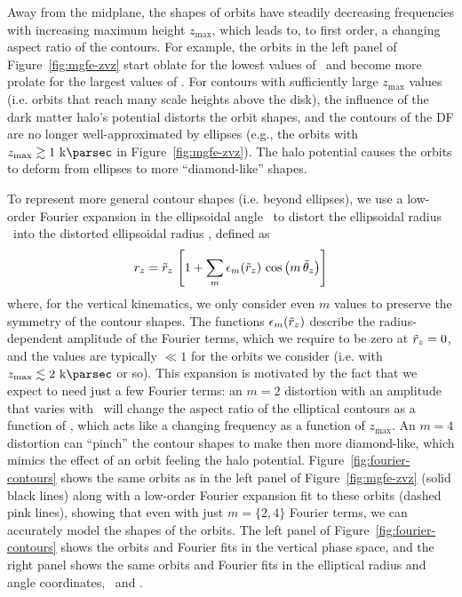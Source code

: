 Away from the midplane, the shapes of orbits have steadily decreasing frequencies with
increasing maximum height $z_{\textrm{max}}$, which leads to, to first order, a changing
aspect ratio of the contours.
For example, the orbits in the left panel of Figure~\ref{fig:mgfe-zvz} start oblate for
the lowest values of \zmax\ and become more prolate for the largest values of \zmax.
For contours with sufficiently large $z_{\textrm{max}}$ values (i.e. orbits that reach
many scale heights above the disk), the influence of the dark matter halo's potential
distorts the orbit shapes, and the contours of the DF are no longer well-approximated by
ellipses (e.g., the orbits with $\zmax \gtrsim 1~\kpc$ in Figure~\ref{fig:mgfe-zvz}).
The halo potential causes the orbits to deform from ellipses to more ``diamond-like''
shapes.

To represent more general contour shapes (i.e. beyond ellipses), we use a low-order
Fourier expansion in the ellipsoidal angle \thzp\ to distort the ellipsoidal radius
\rzp\ into the distorted ellipsoidal radius \rz, defined as
\begin{equation}
    r_z = \tilde{r}_z \, \left[1 + \sum_m \epsilon_m(\tilde{r}_z) \, \cos{\left(m\,\ensuremath{\tilde{\theta}_z}\right)}\right] \label{eq:rz}
\end{equation}
where, for the vertical kinematics, we only consider even $m$ values to preserve the
symmetry of the contour shapes.
The functions $\epsilon_m(\tilde{r}_z)$ describe the radius-dependent amplitude of the Fourier
terms, which we require to be zero at $\tilde{r}_z=0$, and the values are typically $\ll 1$
for the orbits we consider (i.e. with $\zmax \lesssim 2~\kpc$ or so).
This expansion is motivated by the fact that we expect to need just a few Fourier terms:
an $m=2$ distortion with an amplitude that varies with \rzp\ will change the aspect
ratio of the elliptical contours as a function of \rzp, which acts like a changing
frequency as a function of $z_{\textrm{max}}$.
An $m=4$ distortion can ``pinch'' the contour shapes to make then more diamond-like,
which mimics the effect of an orbit feeling the halo potential.
Figure~\ref{fig:fourier-contours} shows the same orbits as in the left panel of
Figure~\ref{fig:mgfe-zvz} (solid black lines) along with a low-order Fourier expansion
fit to these orbits (dashed pink lines), showing that even with just $m=\{2, 4\}$
Fourier terms, we can accurately model the shapes of the orbits.
The left panel of Figure~\ref{fig:fourier-contours} shows the orbits and Fourier fits in
the vertical phase space, and the right panel shows the same orbits and Fourier fits in
the elliptical radius and angle coordinates, \rzp\ and \thzp.

